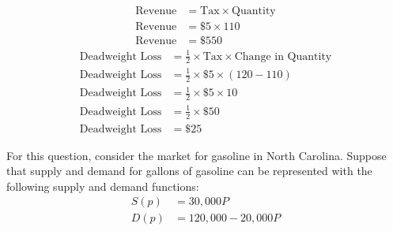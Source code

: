 \documentclass{article}
\begin{document}
\begin{enumerate}[(a)]
    \begin{align*}
        \text{Revenue} &= \text{Tax} \times \text{Quantity}\\
        \text{Revenue} &= \$5 \times 110\\
        \text{Revenue} &= \$550
    \end{align*}
    \begin{align*}
        \text{Deadweight Loss} &= \frac{1}{2} \times \text{Tax} \times \text{Change in Quantity}\\
        \text{Deadweight Loss} &= \frac{1}{2} \times \$5 \times (120 - 110)\\
        \text{Deadweight Loss} &= \frac{1}{2} \times \$5 \times 10\\
        \text{Deadweight Loss} &= \frac{1}{2} \times \$50\\
        \text{Deadweight Loss} &= \$25
    \end{align*}

\end{enumerate}

\pagebreak

For this question, consider the market for gasoline in North Carolina. Suppose that supply and demand for gallons of gasoline can be represented with the following supply and demand functions:
\begin{align*}
    S(p) &= 30,000P\\
    D(p) &= 120,000 - 20,000P
\end{align*}
\end{document}
